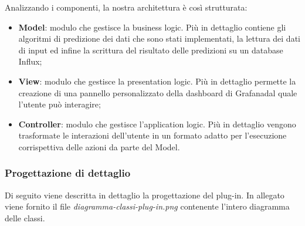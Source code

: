 Analizzando i componenti, la nostra architettura è così strutturata: 
\begin{itemize}
	\item \textbf{Model}: modulo che gestisce la business logic. Più in dettaglio contiene gli algoritmi di predizione dei dati che sono stati implementati, la lettura dei dati di input ed infine la scrittura del risultato delle predizioni su un database Influx;
	\item \textbf{View}: modulo che gestisce la presentation logic. Più in dettaglio permette la creazione di una pannello personalizzato della dashboard di Grafana\glosp dal quale l'utente può interagire;
	\item \textbf{Controller}: modulo che gestisce l'application logic. Più in dettaglio vengono trasformate le interazioni dell'utente in un formato adatto per l'esecuzione corrispettiva delle azioni da parte del Model.
\end{itemize}
\subsubsection{Progettazione di dettaglio}
Di seguito viene descritta in dettaglio la progettazione del plug-in. In allegato viene fornito il file \textit{diagramma-classi-plug-in.png} contenente l'intero diagramma delle classi.
